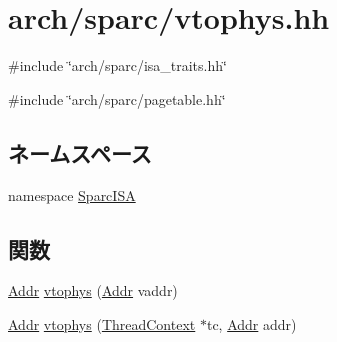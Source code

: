 \hypertarget{sparc_2vtophys_8hh}{
\section{arch/sparc/vtophys.hh}
\label{sparc_2vtophys_8hh}
}
{\ttfamily \#include \char`\"{}arch/sparc/isa\_\-traits.hh\char`\"{}}\par
{\ttfamily \#include \char`\"{}arch/sparc/pagetable.hh\char`\"{}}\par
\subsection*{ネームスペース}
\begin{DoxyCompactItemize}
\item 
namespace \hyperlink{namespaceSparcISA}{SparcISA}
\end{DoxyCompactItemize}
\subsection*{関数}
\begin{DoxyCompactItemize}
\item 
\hyperlink{base_2types_8hh_af1bb03d6a4ee096394a6749f0a169232}{Addr} \hyperlink{namespaceSparcISA_a3828815371ad2b0a1be60abdcb405cf9}{vtophys} (\hyperlink{base_2types_8hh_af1bb03d6a4ee096394a6749f0a169232}{Addr} vaddr)
\item 
\hyperlink{base_2types_8hh_af1bb03d6a4ee096394a6749f0a169232}{Addr} \hyperlink{namespaceSparcISA_af1014ad6d87b8a97e9d660234574a565}{vtophys} (\hyperlink{classThreadContext}{ThreadContext} $\ast$tc, \hyperlink{base_2types_8hh_af1bb03d6a4ee096394a6749f0a169232}{Addr} addr)
\end{DoxyCompactItemize}
